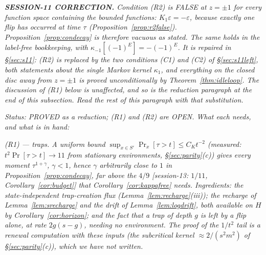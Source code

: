 \emph{\textbf{SESSION-11 CORRECTION.}  Condition (R2) is FALSE at
$z=\pm1$ for every function space containing the bounded functions:
$K_1\varepsilon=-\varepsilon$, because exactly one flip has occurred at
time $\tau$ (Proposition~\ref{prop:r2false}).  Proposition~\ref{prop:condecay}
is therefore vacuous as stated.  The same holds in the
label-free bookkeeping, with $\kappa_{-1}[(-1)^E]=-(-1)^E$.  It is
repaired in \S\ref{sec:s11}: (R2) is replaced by the two conditions
(C1) and (C2) of \S\ref{sec:s11left}, both statements about the single
Markov kernel $\kappa_1$, and everything on the closed disc away from
$z=\pm1$ is proved unconditionally by
Theorem~\ref{thm:idleloop}.  The discussion of (R1) below is
unaffected, and so is the reduction paragraph at the end of this
subsection.  Read the rest of this paragraph with that substitution.}

\emph{Status: PROVED as a reduction; (R1) and (R2) are OPEN.  What each
needs, and what is in hand:}

\emph{(R1) --- traps.  A uniform bound $\sup_{x\in S'}\Pr_x[\tau>t]\le
C_Kt^{-2}$ (measured: $t^2\Pr[\tau>t]\to11$ from stationary
environments, \S\ref{sec:parity}(c)) gives every moment $\tau^{1+\gamma}$,
$\gamma<1$, hence $\gamma$ arbitrarily close to $1$ in
Proposition~\ref{prop:condecay}, far above the $4/9$ [session-13: $1/11$, Corollary~\ref{cor:budget}] that
Corollary~\ref{cor:kappafree} needs.  Ingredients: the state-independent
trap-creation flux (Lemma~\ref{lem:recharge}(iii)); the recharge of
Lemma~\ref{lem:srecharge} and the drift of Lemma~\ref{lem:logdrift},
both available on $H$ by Corollary~\ref{cor:horizon}; and the fact
that a trap of depth $g$ is left by a flip alone, at rate
$2g(s-g)$, needing no environment.  The proof of the $1/t^2$ tail is
a renewal computation with these inputs (the subcritical kernel
$\approx2/(s^2m^2)$ of \S\ref{sec:parity}(c)), which we have not
written.}

